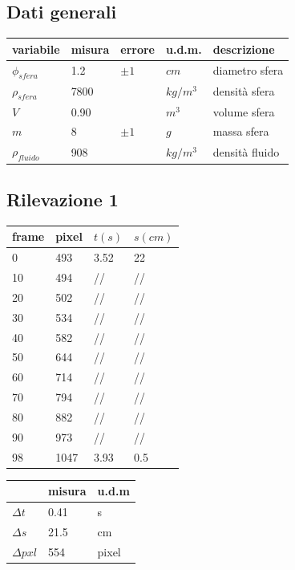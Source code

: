 \subsection{Dati generali}

\begin{center}
\begin{tabular}{ | m{5em} | m{5em} | m{5em} | m{1.4cm}| m{10em} | } 
\hline
variabile & misura & errore &u.d.m. & descrizione \\ 
\hline
\hline
\(\phi_{sfera}\) & 1.2 & $\pm 1$ & \(cm\) & diametro sfera \\ 
\hline
\(\rho_{sfera}\) & 7800 & & \(kg/m^3\) & densità sfera \\ 
\hline
\(V\)   & 0.90 & & \(m^3\)& volume sfera \\ 
\hline
\(m\) & 8 & $\pm 1$ & \(g\)  & massa sfera \\ 
\hline
\(\rho_{fluido}\) & 908 &  & \(kg/m^3\)& densità fluido \\ 
\hline
\end{tabular}
\end{center}

\newpage
\subsection{Rilevazione 1}

\begin{tabular}{ | m{3em} | m{3em} | m{2.5em}| m{2.5em} | } 
 \hline
 \vspace{5pt} frame \vspace{5pt}  &  pixel & $t(s)$ & $s(cm)$\\ 
 \hline
 \hline
 0 & 493 & 3.52  & 22\\ 
 \hline
 10 & 494 & //  & //\\
 \hline
 20 & 502 & //  & //\\ 
 \hline
 30 & 534 & //  & //\\ 
 \hline
 40 & 582 & //  & //\\ 
 \hline
 50 & 644 & //  & //\\ 
 \hline
 60 & 714 & //  & //\\ 
 \hline
 70 & 794 & //  & //\\ 
 \hline
 80 & 882 & //  & //\\ 
 \hline
 90 & 973 & //  & //\\ 
 \hline
 98 & 1047 & 3.93  & 0.5\\ 
 \hline
\end{tabular}
\quad
\begin{tabular}{ | m{3em} | m{3em} | m{1cm}| } 
 \hline
   &  misura & u.d.m \\ 
 \hline
 \hline
 $\Delta t$   &  0.41 	& s\\
 \hline
 $\Delta s$   &  21.5	& cm\\
 \hline
 $\Delta pxl$ & 554	& pixel\\
 \hline
\end{tabular}



